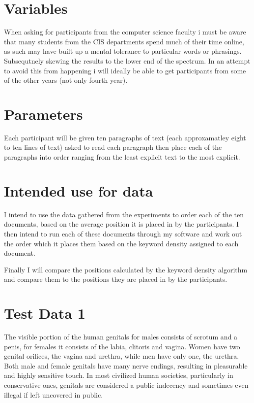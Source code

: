 \documentclass{article}
\begin{document}
\section*{Variables}
When asking for participants from the computer science faculty i must be aware that many students from the CIS departments spend much of their time online, as such may have built up a mental tolerance to particular words or phrasings. Subsequtnely skewing the results to the lower end of the spectrum. In an attempt to avoid this from happening i will ideally be able to get participants from some of the other years (not only fourth year).

\section*{Parameters}
Each participant will be given ten paragraphs of text (each approxamatley eight to ten lines of text) asked to read each paragraph then place each of the paragraphs into order ranging from the least explicit text to the most explicit.

\section*{Intended use for data}
I intend to use the data gathered from the experiments to order each of the ten documents, based on the average position it is placed in by the participants. I then intend to run each of these documents through my software and work out the order which it places them based on the keyword density assigned to each document.

Finally I will compare the positions calculated by the keyword density algorithm and compare them to the positions they are placed in by the participants.

\section*{Test Data 1}
The visible portion of the human genitals for males consists of scrotum and a penis, for females it consists of the labia, clitoris and vagina. Women have two genital orifices, the vagina and urethra, while men have only one, the urethra. Both male and female genitals have many nerve endings, resulting in pleasurable and highly sensitive touch.
In most civilized human societies, particularly in conservative ones, genitals are considered a public indecency and sometimes even illegal if left uncovered in public.
\\
\\
\\
\end{document}
